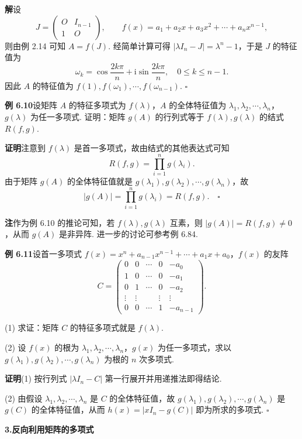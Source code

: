 \documentclass[UTF8,12pt,a4paper,fontset=fandol]{ctexart}
\begin{document}
\noindent\textbf{解}\quad 设
\[
J=\left(\begin{array}{cc}
O & I_{n-1}\\
1 & O
\end{array}\right),\qquad
f(x)=a_1+a_2x+a_3x^2+\cdots+a_nx^{n-1},
\]
则由例 2.14 可知 $A=f(J)$. 经简单计算可得 $|\lambda I_n-J|=\lambda^n-1$，于是 $J$ 的特征值为
\[
\omega_k=\cos\frac{2k\pi}{n}+\mathrm{i}\sin\frac{2k\pi}{n},\quad 0\le k\le n-1.
\]
因此 $A$ 的特征值为 $f(1),f(\omega_1),\cdots,f(\omega_{n-1})$. $\square$

\noindent\textbf{例 6.10}\quad 设矩阵 $A$ 的特征多项式为 $f(\lambda)$，$A$ 的全体特征值为 $\lambda_1,\lambda_2,\cdots,\lambda_n$，$g(\lambda)$ 为任一多项式. 证明：矩阵 $g(A)$ 的行列式等于 $f(\lambda),g(\lambda)$ 的结式 $R(f,g)$.

\noindent\textbf{证明}\quad 注意到 $f(\lambda)$ 是首一多项式，故由结式的其他表达式可知
\[
R(f,g)=\prod_{i=1}^n g(\lambda_i).
\]
由于矩阵 $g(A)$ 的全体特征值就是 $g(\lambda_1),g(\lambda_2),\cdots,g(\lambda_n)$，故
\[
|g(A)|=\prod_{i=1}^n g(\lambda_i)=R(f,g). \quad \square
\]

\noindent\textbf{注}\quad 作为例 6.10 的推论可知，若 $f(\lambda),g(\lambda)$ 互素，则 $|g(A)|=R(f,g)\ne 0$，从而 $g(A)$ 是非异阵. 进一步的讨论可参考例 6.84.

\noindent\textbf{例 6.11}\quad 设首一多项式 $f(x)=x^n+a_{n-1}x^{n-1}+\cdots+a_1x+a_0$，$f(x)$ 的友阵
\[
C=\left(\begin{array}{ccccc}
0 & 0 & \cdots & 0 & -a_0\\
1 & 0 & \cdots & 0 & -a_1\\
0 & 1 & \cdots & 0 & -a_2\\
\vdots & \vdots & & \vdots & \vdots\\
0 & 0 & \cdots & 1 & -a_{n-1}
\end{array}\right).
\]

(1) 求证：矩阵 $C$ 的特征多项式就是 $f(\lambda)$.

(2) 设 $f(x)$ 的根为 $\lambda_1,\lambda_2,\cdots,\lambda_n$，$g(x)$ 为任一多项式，求以 $g(\lambda_1),g(\lambda_2),\cdots,g(\lambda_n)$ 为根的 $n$ 次多项式.

\noindent\textbf{证明}\quad (1) 按行列式 $|\lambda I_n-C|$ 第一行展开并用递推法即得结论.

(2) 由假设 $\lambda_1,\lambda_2,\cdots,\lambda_n$ 是 $C$ 的全体特征值，故 $g(\lambda_1),g(\lambda_2),\cdots,g(\lambda_n)$ 是 $g(C)$ 的全体特征值，从而 $h(x)=|xI_n-g(C)|$ 即为所求的多项式. $\square$

\noindent\textbf{3.\quad 反向利用矩阵的多项式}
\end{document}
